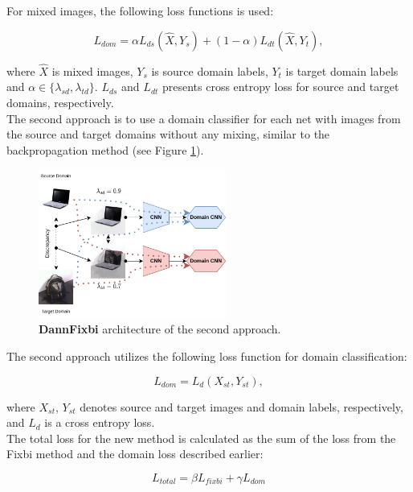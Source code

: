 For mixed images, the following loss functions is used:

\begin{equation}
    L_{dom} = \alpha L_{ds}(\hat{X}, Y_{s}) + (1 - \alpha) L_{dt}(\hat{X}, Y_{t}) ,
\end{equation}


where $\hat{X}$ is mixed images, $Y_{s}$ is source domain labels, $Y_{t}$ is target domain labels and $\alpha \in \{\lambda_{sd}, \lambda_{td}\}$. $L_{ds}$ and $L_{dt}$ presents cross entropy loss for source and target domains, respectively.\\


The second approach is to use a domain classifier for each net with images from the source and target domains without any mixing, similar to the backpropagation method (see Figure \ref{fig:dannfixsep}).\\

\begin{figure}[H]
    \centering
    \includegraphics[width=0.55\textwidth]{Figures/Results/df_sep.png}
    \caption{\textbf{DannFixbi} architecture of the second approach.}
    \label{fig:dannfixsep}
\end{figure}

The second approach utilizes the following loss function for domain classification:

\begin{equation}
L_{dom} = L_{d}(X_{st}, Y_{st}) ,
\end{equation}

where $X_{st}$,  $Y_{st}$ denotes source and target images and domain labels, respectively, and $L_{d}$ is a cross entropy loss. \\

The total loss for the new method is calculated as the sum of the loss from the Fixbi method and the domain loss described earlier:

\begin{equation}
L_{total} = \beta L_{fixbi} + \gamma L_{dom}
\end{equation}

